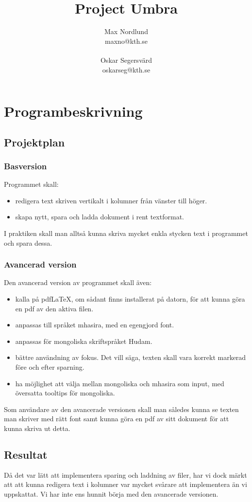\documentclass[a4paper,11p,twoside]{article}
\title{Project Umbra}
\author{Max Nordlund\\ maxno@kth.se \\ \\ Oskar Segersvärd \\ oskarseg@kth.se}
\begin{document}
\maketitle

\pagebreak

\section{Programbeskrivning}
\subsection{Projektplan}
\subsubsection{Basversion}
Programmet skall:
\begin{itemize}
	\item redigera text skriven vertikalt i kolumner från vänster till höger.
	\item skapa nytt, spara och ladda dokument i rent textformat.
\end{itemize}
I praktiken skall man alltså kunna skriva mycket enkla stycken text i programmet och spara dessa.

\subsubsection{Avancerad version}
Den avancerad version av programmet skall även:
\begin{itemize}
	\item kalla på pdf\LaTeX, om sådant finns installerat på datorn, för att kunna göra en pdf av den aktiva filen.
	\item anpassas till språket mhasira, med en egengjord font.
	\item anpassas för mongoliska skriftspråket Hudam.
	\item bättre användning av fokus. Det vill säga, texten skall vara korrekt markerad före och efter sparning.
	\item ha möjlighet att välja mellan mongoliska och mhasira som input, med översatta tooltips för mongoliska.
\end{itemize}
Som användare av den avancerade versionen skall man således kunna se texten man skriver med rätt font samt kunna göra en pdf av sitt dokument för att kunna skriva ut detta.

\subsection{Resultat}
Då det var lätt att implementera sparing och laddning av filer, har vi dock märkt att att kunna redigera text i kolumner var mycket svårare att implementera än vi uppskattat. Vi har inte ens hunnit börja med den avancerade versionen.
\end{document}
